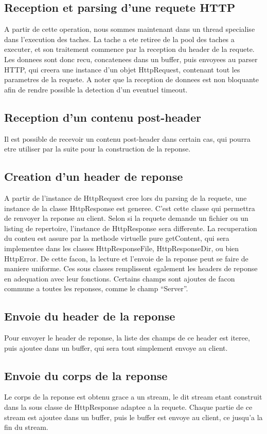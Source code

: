 \subsection{Reception et parsing d'une requete HTTP}
A partir de cette operation, nous sommes maintenant dans un thread specialise dans l'execution des taches.
La tache a ete retiree de la pool des taches a executer, et son traitement commence par la reception du header de la requete.
Les donnees sont donc recu, concatenees dans un buffer, puis envoyees au parser HTTP, qui creera une instance d'un objet HttpRequest, contenant tout les parametres de la requete.
A noter que la reception de donnees est non bloquante afin de rendre possible la detection d'un eventuel timeout.

\subsection {Reception d'un contenu post-header}
Il est possible de recevoir un contenu post-header dans certain cas, qui pourra etre utiliser par la suite pour la construction de la reponse.

\subsection {Creation d'un header de reponse}
A partir de l'instance de HttpRequest cree lors du parsing de la requete, une instance de la classe HttpResponse est generee. C'est cette classe qui permettra de renvoyer la reponse au client.
Selon si la requete demande un fichier ou un listing de repertoire, l'instance de HttpResponse sera differente. La recuperation du conteu est assure par la methode virtuelle pure getContent, qui sera implementee dans les classes HttpResponseFile, HttpResponseDir, ou bien HttpError.
De cette facon, la lecture et l'envoie de la reponse peut se faire de maniere uniforme.
Ces sous classes remplissent egalement les headers de reponse en adequation avec leur fonctions.
Certains champs sont ajoutes de facon commune a toutes les reponses, comme le champ ``Server''.

\subsection {Envoie du header de la reponse}
Pour envoyer le header de reponse, la liste des champs de ce header est iteree, puis ajoutee dans un buffer, qui sera tout simplement envoye au client.

\subsection {Envoie du corps de la reponse}
Le corps de la reponse est obtenu grace a un stream, le dit stream etant construit dans la sous classe de HttpResponse adaptee a la requete.
Chaque partie de ce stream est ajoutee dans un buffer, puis le buffer est envoye au client, ce jusqu'a la fin du stream.

